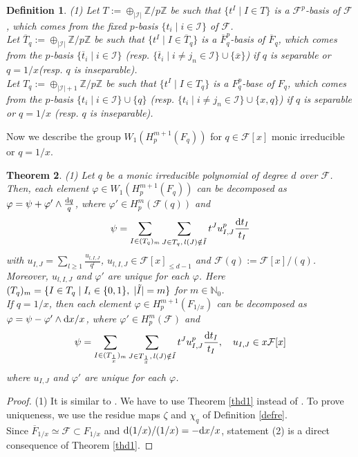 \documentclass[times,10pt]{amsart}
\newcommand{\N}{\ensuremath{\mathbb{N}}}
\newcommand{\Z}{\ensuremath{\mathbb{Z}}}
\newcommand{\dd}{{\rm d}}
\newcommand{\F}{\ensuremath{\mathcal{F}}}
\newcommand{\I}{\ensuremath{\mathcal{I}}}
\newcommand{\resp}{{\it resp. }}
\renewcommand{\phi}{\varphi}
\renewcommand{\cong}{\simeq}
\renewcommand{\resp}{{\it resp. }}
\newtheorem{thm}{Theorem}[section]
\newtheorem{defn}[thm]{Definition}%
\begin{document}
\begin{defn}\label{dpb}(1)  Let  $T:= \oplus_{|\I|}\Z/p\Z $ be such that $\{ t^I\mid I\in T\}$ is  a $\F^p$-basis of $\F$, which comes from the fixed $p$-basis $ \{ t_i\mid i\in \I\}$ of $\F$.\\

{ Let $ \overline{T}_q:= \oplus_{|\I|}\Z/p\Z$ be such that  $ \{ t^I\mid I\in \overline{T}_q\}$ is a $\overline{F}_q^p$-basis of $\overline{F}_q$, which comes from the $p$-basis $\{ \overline{t}_i\mid i\in \I\}$ (\resp $ \{ \overline{t}_i\mid i\neq j_n\in \I\}\cup\{\overline{x}\}$) if $q$ is separable or $q=1/x$(\resp $q$ is inseparable).}\\

{ Let $T_q:= \oplus_{|\I|+1}\Z/p\Z$ be such that  $ \{ t^I\mid I\in T_q\}$  is a $F_q^p$-base of $F_q$, which comes from the $p$-basis $\{ t_i\mid i\in \I\} \cup \{q\}$ (\resp $ \{ t_i\mid i\neq j_n\in \I\}\cup\{ x, q\}$) if $q$ is separable or $q=1/x$ (\resp $q$ is inseparable).}
\end{defn}
 Now we describe the group  $ W_1(H_p^{m+1}(F_q))$ for $q\in \F[x]$ monic irreducible or $q=1/x$.

 \begin{thm}\label{thd2}
    (1) Let $q$ be a monic irreducible polynomial of degree $d$ over $\F$. Then, each element $\phi\in W_1( H_p^{m+1}(F_q))$ can be decomposed as $ \phi=\psi+ \phi'\wedge \frac{\dd q}{q} $, where $ \phi'\in H_p^{m}(\F(q))$ and $$  \psi= \sum_{I\in (T_q)_m}\sum_{J\in T_q,\, l(J)\notin \tilde{I}} t^J u^p_{I,J}\frac{\dd t_I}{t_I}$$ with $ u_{I,J}= \sum_{l\geq 1} \frac{u_{l,I,J}}{q^l}$, $u_{l,I,J}\in\F[x]_{\leq d-1} $ and $\F(q):= \F[x]/(q)$. Moreover, $u_{l,I,J}$ and $\phi'$ are unique for each $\phi$. Here $(T_q)_m=\{ I\in T_q\mid I_i\in \{0,1\},\hspace{1mm}  |\tilde{I}|=m\}$ for $m\in \N_0$.\\
    
     If $q=1/x$, then each element $\phi\in H_p^{m+1}(F_{1/x})$ can be decomposed as $\phi= \psi- \phi'\wedge \dd x/x$, where $\phi'\in H_p^m(\F)$ and $$ \psi=\sum_{I\in (T_{\frac{1}{x}})_m}\sum_{J\in T_{\frac{1}{x}},\, l(J)\notin \tilde{I}}t^J u^p_{I,J}\frac{\dd t_I}{t_I}, \quad { u_{I,J}\in x\F[x]}$$ where $u_{I,J}$ and $\phi'$ are unique for each $\phi$.
 \end{thm}

 \begin{proof}(1)  It is similar to \cite[Theorem 4.2]{ex}. We have to use Theorem \ref{thd1}  instead of \cite[Theorem 2.5]{ex}.  To prove uniqueness, we use the residue maps $\zeta$ and $\chi_q$ of Definition \ref{defre}.\\

   Since $ \overline{F}_{1/x}\cong \F\subset F_{{1/x}}$ and $\dd (1/x)/(1/x)= -\dd x/x$, statement (2) is a direct consequence of Theorem \ref{thd1}.
      \end{proof}
\end{document}
